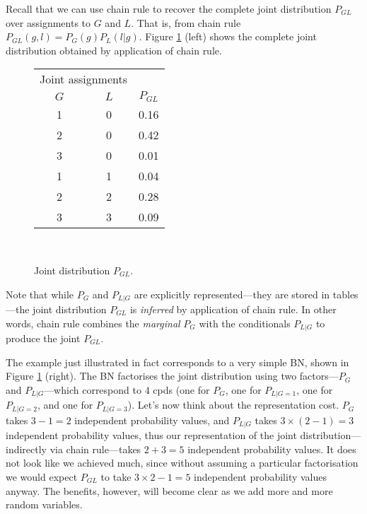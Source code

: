 Recall that we can use chain rule to recover the complete joint distribution $P_{GL}$ over assignments to $G$ and $L$. That is, from chain rule $P_{GL}(g, l) = P_G(g)P_L(l|g)$.
Figure \ref{fig:joint-GL} (left) shows the complete joint distribution obtained by application of chain rule. 
\begin{figure}[h]\small\centering
	\begin{tabular}{c | c | c}
	\multicolumn{2}{c|}{Joint assignments} &  \\  
	$G$  & $L$   & $P_{GL}$ \\ \hline
	1    & 0     & 0.16 \\
	2    & 0     & 0.42 \\
	3    & 0     & 0.01 \\
	1    & 1     & 0.04 \\
	2    & 2     & 0.28 \\
	3    & 3     & 0.09 
	\end{tabular}
	~
	\caption{\label{fig:joint-GL}Joint distribution $P_{GL}$.}
\end{figure}
Note that while $P_G$ and $P_{L|G}$ are explicitly represented---they are stored in tables---the joint distribution $P_{GL}$ is \emph{inferred} by application of chain rule.
In other words, chain rule combines the \emph{marginal} $P_G$ with the conditionals $P_{L|G}$ to produce the joint $P_{GL}$.

The example just illustrated in fact corresponds to a very simple BN, shown in Figure \ref{fig:joint-GL} (right). The BN factorises the joint distribution using two factors---$P_G$ and $P_{L|G}$---which correspond to $4$ cpds (one for $P_G$, one for $P_{L|G=1}$, one for $P_{L|G=2}$, and one for $P_{L|G=3}$). 
Let's now think about the representation cost. $P_G$ takes $3-1=2$ independent probability values, and $P_{L|G}$ takes $3 \times (2-1) = 3$ independent probability values, thus our representation of the joint distribution---indirectly via chain rule---takes $2 + 3=5$ independent probability values. 
It does not look like we achieved much, since without assuming a particular factorisation we would expect $P_{GL}$ to take $3\times 2 - 1=5$ independent probability values anyway. 
The benefits, however, will become clear as we add more and more random variables.



